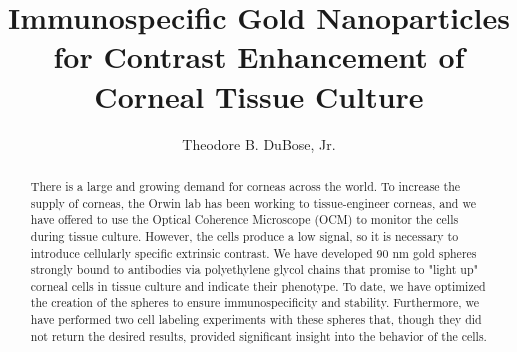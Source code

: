 \documentclass{hmcthesis}
\title{Immunospecific Gold Nanoparticles for Contrast Enhancement of Corneal Tissue Culture}
\author{Theodore B. DuBose, Jr.}
\begin{document}
\frontmatter


\maketitle




\begin{abstract}
There is a large and growing demand for corneas across the world. To increase the supply of corneas, the  Orwin lab  has been working to tissue-engineer  corneas, and we have offered  to use the Optical Coherence Microscope (OCM) to monitor the cells during tissue culture. However, the cells produce a low signal, so it is necessary to introduce cellularly specific extrinsic contrast. We have developed 90 nm gold spheres strongly bound to antibodies via polyethylene glycol chains that promise to "light up" corneal cells in tissue culture and indicate their phenotype. To date, we have optimized the creation of the spheres to ensure immunospecificity and stability. Furthermore, we have performed two cell labeling experiments with these spheres that, though they did not return the desired results, provided significant insight into the behavior of the cells.
\end{abstract}



\end{document}
